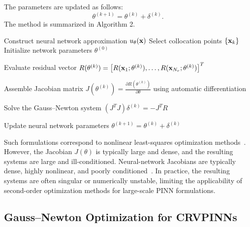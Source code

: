 \documentclass[review]{elsarticle}
\begin{document}
The parameters are updated as follows:
\begin{equation}
\theta^{(k+1)} = \theta^{(k)} + \delta^{(k)}.
\end{equation}
The method is summarized in Algorithm 2.
\begin{algorithm}
\caption{Gauss--Newton Training of Physics-Informed Neural Networks}
\begin{algorithmic}[1]

\State Construct neural network approximation $u_\theta({\bf x})$
\State Select collocation points $\{{\bf x}_k\}$
\State Initialize network parameters $\theta^{(0)}$


    \State Evaluate residual vector
    $
    R(\theta^{(k)})
    =
    \left[
    R({\bf x}_1;\theta^{(k)}),
    \dots,
    R({\bf x}_{N_r};\theta^{(k)})
    \right]^T
    $

    \State Assemble Jacobian matrix
    $
    J(\theta^{(k)})
    =
    \frac{\partial R(\theta^{(k)})}{\partial \theta}
    $
    using automatic differentiation

    \State Solve the Gauss--Newton system
    $
    \left(
    J^T J
    \right)\delta^{(k)}
    =
    -J^T R
    $

    \State Update neural network parameters
    $
    \theta^{(k+1)}
    =
    \theta^{(k)}
    +
    \delta^{(k)}
    $

\EndWhile


\end{algorithmic}
\end{algorithm}
Such formulations correspond to nonlinear least-squares optimization methods~\cite{nocedal}.
However, the Jacobian $J(\theta)$ is typically large and dense, 
and the resulting systems are large and ill-conditioned.
Neural-network Jacobians are typically dense, highly nonlinear, and poorly conditioned~\cite{wang2021understanding}. In practice, the resulting systems are often singular or numerically unstable, limiting the applicability of second-order optimization methods for large-scale PINN formulations.

\subsection{Gauss--Newton Optimization for CRVPINNs}
\end{document}
